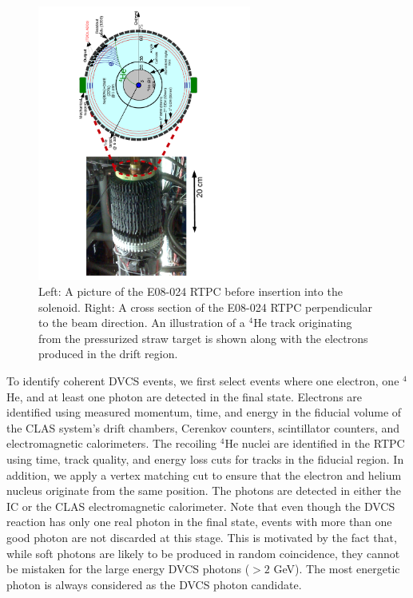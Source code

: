 \documentclass[twocolumn,nofootinbib,showpacs,prl,superscriptaddress,secnumarabic,amssymb,nobibnotes,aps,floatfix]{revtex4}
\begin{document}
\begin{figure}[tb]
\vspace{-1.1cm}
\includegraphics[width=7.0cm,angle=-90]{figs/RTPC.pdf}
\vspace{-1.1cm}
\caption{Left: A picture of the E08-024 RTPC before insertion into the 
   solenoid. Right: A cross section of the E08-024 RTPC perpendicular to the 
   beam direction. An illustration of a $^4$He track originating from the 
   pressurized straw target is shown along with the electrons produced in the 
   drift region.}
\label{fig:RTPC}
\end{figure}

To identify coherent DVCS events, we first select events where one electron, 
one $^4$He, and at least one photon are detected in the final state. Electrons 
are identified using measured momentum, time, and energy in the fiducial volume 
of the CLAS system's drift chambers, Cerenkov counters, scintillator counters, 
and electromagnetic calorimeters. The recoiling $^4$He nuclei are identified in 
the RTPC using time, track quality, and energy loss cuts for tracks in the 
fiducial region. In addition, we apply a vertex matching cut to ensure that the 
electron and helium nucleus originate from the same position. The photons are 
detected in either the IC or the CLAS electromagnetic calorimeter. Note that 
even though the DVCS reaction has only one real photon in the final state, 
events with more than one good photon are not discarded at this stage. This is 
motivated by the fact that, while soft photons are likely to be produced in 
random coincidence, they cannot be mistaken for the large energy DVCS photons 
($>2$ GeV). The most energetic photon is always considered as the DVCS photon 
candidate.
\end{document}
